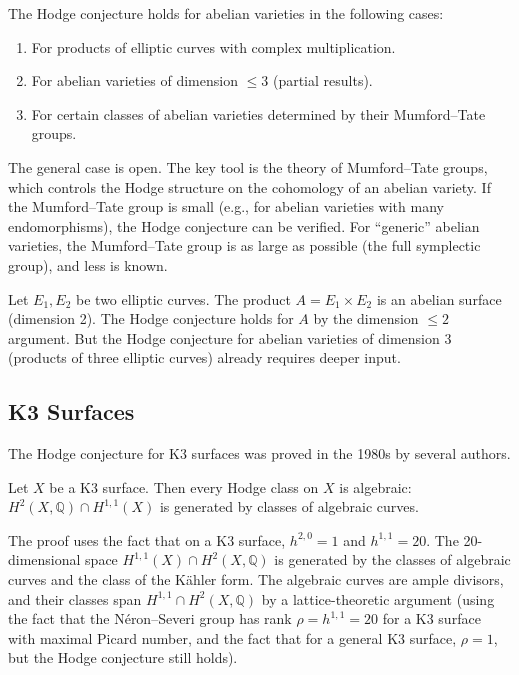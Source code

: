 \begin{theorem}
The Hodge conjecture holds for abelian varieties in the following cases:
\begin{enumerate}
\item For products of elliptic curves with complex multiplication.
\item For abelian varieties of dimension $\le 3$ (partial results).
\item For certain classes of abelian varieties determined by their Mumford--Tate groups.
\end{enumerate}
\end{theorem}

The general case is open. The key tool is the theory of Mumford--Tate groups, which controls the Hodge structure on the cohomology of an abelian variety. If the Mumford--Tate group is small (e.g., for abelian varieties with many endomorphisms), the Hodge conjecture can be verified. For ``generic'' abelian varieties, the Mumford--Tate group is as large as possible (the full symplectic group), and less is known.

\begin{example}
Let $E_1, E_2$ be two elliptic curves. The product $A = E_1 \times E_2$ is an abelian surface (dimension 2). The Hodge conjecture holds for $A$ by the dimension $\le 2$ argument. But the Hodge conjecture for abelian varieties of dimension 3 (products of three elliptic curves) already requires deeper input.
\end{example}

\subsection{K3 Surfaces}

The Hodge conjecture for K3 surfaces was proved in the 1980s by several authors.

\begin{theorem}
Let $X$ be a K3 surface. Then every Hodge class on $X$ is algebraic: $H^2(X, \mathbb{Q}) \cap H^{1,1}(X)$ is generated by classes of algebraic curves.
\end{theorem}

\begin{remark}
The proof uses the fact that on a K3 surface, $h^{2,0} = 1$ and $h^{1,1} = 20$. The 20-dimensional space $H^{1,1}(X) \cap H^2(X, \mathbb{Q})$ is generated by the classes of algebraic curves and the class of the K\"{a}hler form. The algebraic curves are ample divisors, and their classes span $H^{1,1} \cap H^2(X, \mathbb{Q})$ by a lattice-theoretic argument (using the fact that the N\'eron--Severi group has rank $\rho = h^{1,1} = 20$ for a K3 surface with maximal Picard number, and the fact that for a general K3 surface, $\rho = 1$, but the Hodge conjecture still holds).
\end{remark}

